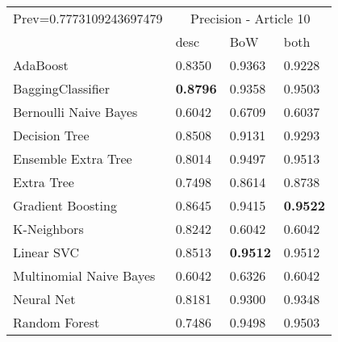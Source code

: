 \begin{tabular}{|l|l|l|l| }
\hline
Prev=0.7773109243697479 &  \multicolumn{3}{c|}{Precision - Article 10} \\
\cline{2-4} & desc & BoW & both \\ \hline
AdaBoost                & 0.8350 & 0.9363 & 0.9228\\
BaggingClassifier       & {\bf 0.8796} & 0.9358 & 0.9503\\
Bernoulli Naive Bayes   & 0.6042 & 0.6709 & 0.6037\\
Decision Tree           & 0.8508 & 0.9131 & 0.9293\\
Ensemble Extra Tree     & 0.8014 & 0.9497 & 0.9513\\
Extra Tree              & 0.7498 & 0.8614 & 0.8738\\
Gradient Boosting       & 0.8645 & 0.9415 & {\bf 0.9522}\\
K-Neighbors             & 0.8242 & 0.6042 & 0.6042\\
Linear SVC              & 0.8513 & {\bf 0.9512} & 0.9512\\
Multinomial Naive Bayes & 0.6042 & 0.6326 & 0.6042\\
Neural Net              & 0.8181 & 0.9300 & 0.9348\\
Random Forest           & 0.7486 & 0.9498 & 0.9503\\
\hline
\end{tabular}